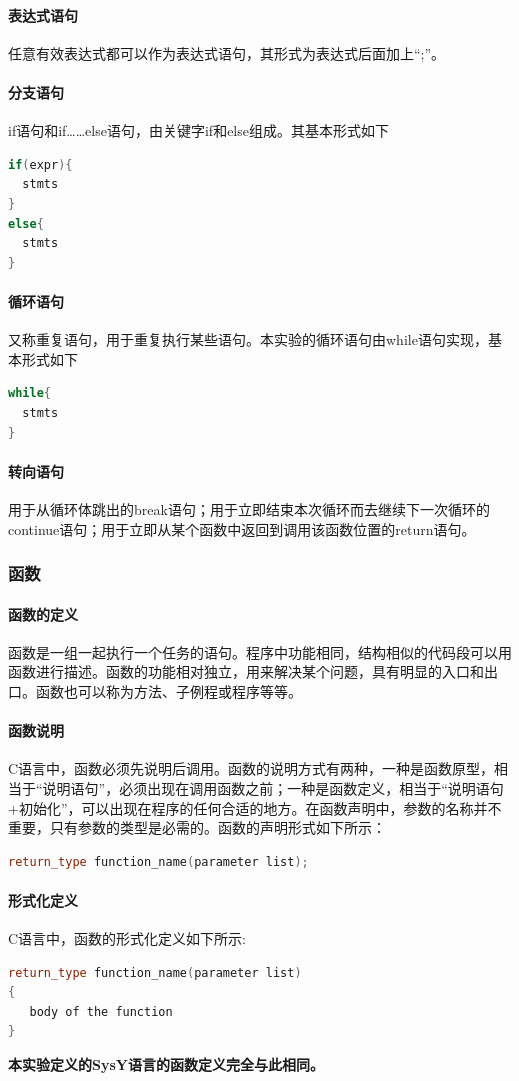 \documentclass[UTF8,a4paper,10pt]{ctexart}
\begin{document}
\paragraph{表达式语句} 任意有效表达式都可以作为表达式语句，其形式为表达式后面加上“;”。
\paragraph{分支语句} if语句和if……else语句，由关键字if和else组成。其基本形式如下
\begin{lstlisting}[language = c++]
if(expr){
  stmts
}
else{
  stmts
}
\end{lstlisting}
\paragraph{循环语句} 又称重复语句，用于重复执行某些语句。本实验的循环语句由while语句实现，基本形式如下
\begin{lstlisting}[language = c++]
while{
  stmts
}
\end{lstlisting}
\paragraph{转向语句} 用于从循环体跳出的break语句；用于立即结束本次循环而去继续下一次循环的continue语句；用于立即从某个函数中返回到调用该函数位置的return语句。
\subsubsection{函数}
\paragraph{函数的定义}函数是一组一起执行一个任务的语句。程序中功能相同，结构相似的代码段可以用函数进行描述。函数的功能相对独立，用来解决某个问题，具有明显的入口和出口。函数也可以称为方法、子例程或程序等等。
\paragraph{函数说明}
C语言中，函数必须先说明后调用。函数的说明方式有两种，一种是函数原型，相当于“说明语句”，必须出现在调用函数之前；一种是函数定义，相当于“说明语句+初始化”，可以出现在程序的任何合适的地方。在函数声明中，参数的名称并不重要，只有参数的类型是必需的。函数的声明形式如下所示：
\begin{lstlisting}[language = c++]
return_type function_name(parameter list);
\end{lstlisting}
\paragraph{形式化定义}C语言中，函数的形式化定义如下所示:
\begin{lstlisting}[language = c++]
return_type function_name(parameter list)
{
   body of the function
}
\end{lstlisting}
\textbf{本实验定义的SysY语言的函数定义完全与此相同。}
\end{document}
